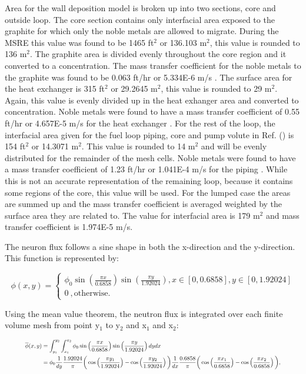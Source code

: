 Area for the wall deposition model is broken up into two sections, core and outside loop. The core section contains only interfacial area exposed to the graphite for which only the noble metals are allowed to migrate. During the MSRE this value was found to be 1465 ft$^{2}$ or 136.103 m$^{2}$, this value is rounded to 136 m$^{2}$. The graphite area is divided evenly throughout the core region and it converted to a concentration. The mass transfer coefficient for the noble metals to the graphite was found to be 0.063 ft/hr or 5.334E-6 m/s \cite{kedl1972}. The surface area for the heat exchanger is 315 ft$^{2}$ or 29.2645 m$^{2}$, this value is rounded to 29 m$^{2}$. Again, this value is evenly divided up in the heat exhanger area and converted to concentration. Noble metals were found to have a mass transfer coefficient of 0.55 ft/hr or 4.657E-5 m/s for the heat exchanger \cite{kedl1972}. For the rest of the loop, the interfacial area given for the fuel loop piping, core and pump volute in Ref. (\cite{kedl1972}) is 154 ft$^{2}$ or 14.3071 m$^{2}$. This value is rounded to 14 m$^{2}$ and will be evenly distributed for the remainder of the mesh cells. Noble metals were found to have a mass transfer coefficient of 1.23 ft/hr or 1.041E-4 m/s for the piping \cite{kedl1972}. While this is not an accurate representation of the remaining loop, because it contains some regions of the core, this value will be used. For the lumped case the areas are summed up and the mass transfer coefficient is averaged weighted by the surface area they are related to. The value for interfacial area is 179 m$^{2}$ and mass transfer coefficient is 1.974E-5 m/s.

The neuron flux follows a sine shape in both the x-direction and the y-direction. This function is represented by:


\begin{equation}
\phi (x, y) = \begin{cases}
  \phi_{0} \sin\left(\frac{\pi x}{0.6858}\right)\sin\left(\frac{\pi y}{1.92024}\right) , x \in [0,0.6858], y \in [0,1.92024] \\
  0\ , \text{otherwise}.
  \label{eq:msreflux}
\end{cases}
\end{equation}

\noindent Using the mean value theorem, the neutron flux is integrated over each finite volume mesh from point y$_{1}$ to y$_{2}$ and x$_{1}$ and x$_{2}$:

\begin{equation}
\resizebox{.9 \textwidth}{!}{$
	\begin{split}
	\overline{\phi}(x,y) &= \int_{y_{1}}^{y_{2}} \int_{x_{1}}^{x_{2}} \phi_{0} \sin\left(\frac{\pi x}{0.6858}\right)\sin\left(\frac{\pi y}{1.92024}\right)dy dx \\
	&=  \phi_{0}\frac{1}{dy}\frac{1.92024}{\pi} \bigg( \cos\left(\frac{\pi y_{1}}{1.92024}\right) - \cos\left(\frac{\pi y_{2}}{1.92024}\right) \bigg) \frac{1}{dx}\frac{0.6858}{\pi} \bigg( \cos\left(\frac{\pi x_{1}}{0.6858}\right) - \cos\left(\frac{\pi x_{2}}{0.6858}\right) \bigg),
	\end{split}$}
	\label{eq:fine_mesh_neutron_flux}
\end{equation}

